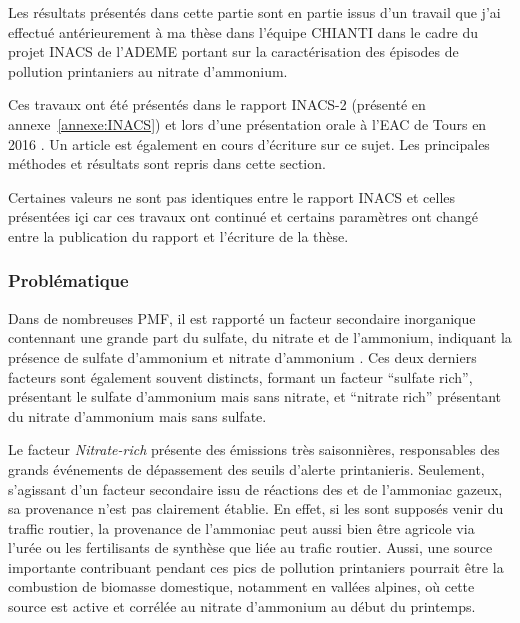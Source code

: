\begin{tcolorbox}[colback=red!5!white,colframe=Melon,title=Note]
Les résultats présentés dans cette partie sont en partie issus d'un travail que j'ai
effectué antérieurement à ma
thèse dans l'équipe CHIANTI dans le cadre du projet INACS de l'ADEME portant sur
la caractérisation des épisodes de pollution printaniers au nitrate d'ammonium.
\end{tcolorbox}

\begin{tcolorbox}[colback=red!5!white,colframe=ProcessBlue,title=Note]
    Ces travaux ont été présentés dans le rapport INACS-2 (présenté en
    annexe~\ref{annexe:INACS}) et lors d'une présentation orale à l'EAC de Tours en 2016
    \autocite{weberNitrogen2016}.
    Un article est également en cours d'écriture sur ce sujet.  Les principales méthodes
    et résultats sont repris dans cette section.

    Certaines valeurs ne sont pas identiques entre le rapport INACS et celles présentées içi
    car ces travaux ont continué et certains paramètres ont changé entre la publication
    du rapport et l'écriture de la thèse.
\end{tcolorbox}


\subsubsection{Problématique}%
\label{ssub:problématique}

Dans de nombreuses PMF, il est rapporté un facteur secondaire inorganique contennant une
grande part du sulfate, du nitrate et de l'ammonium, indiquant la présence de sulfate
d'ammonium  et nitrate d'ammonium . Ces deux derniers facteurs sont
également souvent distincts, formant un facteur ``sulfate rich'', présentant le sulfate
d'ammonium mais sans nitrate, et ``nitrate rich'' présentant du nitrate d'ammonium mais
sans sulfate.

Le facteur \textit{Nitrate-rich} présente des émissions très saisonnières, responsables
des grands événements de dépassement des seuils d'alerte printanieris. Seulement,
s'agissant d'un facteur secondaire issu de réactions des  et de l'ammoniac
 gazeux, sa provenance n'est pas clairement établie. En effet, si les 
sont supposés venir du traffic routier, la provenance de l'ammoniac peut aussi bien être
agricole via l'urée ou les fertilisants de synthèse que liée au trafic routier. Aussi, une
source importante contribuant pendant ces pics de pollution printaniers pourrait être la
combustion de biomasse domestique, notamment en vallées alpines, où cette source est
active et corrélée au nitrate d'ammonium au début du printemps.

